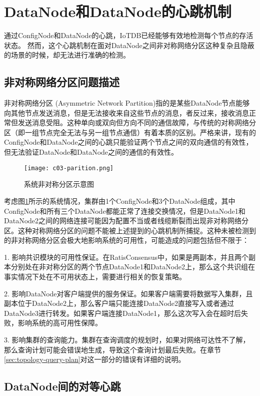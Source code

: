 \section{DataNode和DataNode的心跳机制}


通过ConfigNode和DataNode的心跳，IoTDB已经能够有效地检测每个节点的存活状态。
然而，这个心跳机制在面对DataNode之间非对称网络分区这种复杂且隐蔽的场景的时候，却无法进行准确的检测。

\subsection{非对称网络分区问题描述}
非对称网络分区 (Asymmetric Network Partition)指的是某些DataNode节点能够向其他节点发送消息，但是无法接收来自这些节点的消息，者反过来，接收消息正常但发送消息受阻。这种单向或双向但方向不同的通信故障，与传统的对称网络分区（即一组节点完全无法与另一组节点通信）有着本质的区别。严格来讲，现有的ConfigNode和DataNode之间的心跳只能验证两个节点之间的双向通信的有效性，但无法验证DataNode和DataNode之间的通信的有效性。

\begin{figure}
  \centering
  \texttt{[image: c03-parition.png]}
  \caption{系统非对称分区示意图}
  \label{fig:c03-partition}
\end{figure}

考虑图\ref{fig:c03-partition}所示的系统情况，集群由1个ConfigNode和3个DataNode组成，其中ConfigNode和所有三个DataNode都能正常了连接交换情况，但是DataNode1和DataNode2之间的网络连接可能因为配置不当或者线缆断裂而出现非对称网络分区。这种对称网络分区的问题不能被上述提到的心跳机制所捕捉。这种未被检测到的非对称网络分区会极大地影响系统的可用性，可能造成的问题包括但不限于：

1. 影响共识模块的可用性保证。在RatisConsensus中，如果是两副本，并且两个副本分别处在非对称分区的两个节点DataNode1和DataNode2上，那么这个共识组在事实情况下处在不可用状态上，需要进行相关的恢复策略。

2. 影响DataNode对客户端提供的服务保证。如果客户端需要将数据写入集群，且副本位于DataNode2上，那么客户端只能连接DataNode2直接写入或者通过DataNode3进行转发。如果客户端连接DataNode1，那么这次写入会在超时后失败，影响系统的高可用性保障。

3. 影响集群的查询能力。集群在查询调度的规划时，如果对网络可达性不了解，那么查询计划可能会错误地生成，导致这个查询计划最后失败。在章节\ref{sec:topology-query-plan}对这一部分的错误有详细的说明。

\subsection{DataNode间的对等心跳}

